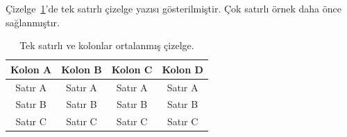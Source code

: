 \documentclass[a4paper,oneside,12pt]{report}
\begin{document}
Çizelge~\ref{tab:ornek2}'de tek satırlı çizelge yazısı gösterilmiştir. Çok satırlı örnek daha önce sağlanmıştır.
\begin{table}[h]
	\centering
	\caption{Tek satırlı ve kolonlar ortalanmış çizelge.}
	\begin{tabular}{cccc}
		\hline
		Kolon A & Kolon B & Kolon C & Kolon D \\
		\hline
		Satır A & Satır A & Satır A & Satır A \\
		Satır B & Satır B & Satır B & Satır B \\
		Satır C & Satır C & Satır C & Satır C \\
		\hline
	\end{tabular}
	\label{tab:ornek2}
\end{table}
\lipsum[1-3]

\begingroup
\begin{table}[thbp]
	\caption[Birden çok sayfaya dağılan tablo örneği]{Birden çok sayfaya dağılan çizelgenin çok satırlı başlık içeren örneği}
	\label{ciz:multiPageSample}
	\vskip -14pt
\end{table}
\end{document}
